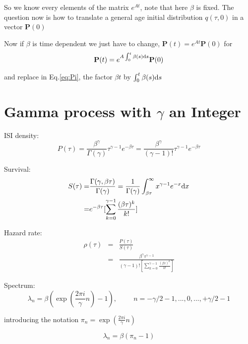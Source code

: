 \documentclass[a4paper,12pt,twoside]{article}
\def \dd  {{\rm d}}
\begin{document}
So we know every elements of the matrix $e^{At}$, note that here $\beta$ is fixed.
The question now is how to translate a general age initial distribution $q(\tau,0)$ in a vector $\textbf{P}(0)$

Now if $\beta$ is time dependent we just have to change,  $\textbf{P}(t)=e^{At}\textbf{P}(0)$ for
\begin{equation}
 \textbf{P}(t)=e^{A\int_{0}^{t}\beta(s)\dd s}\textbf{P}(0)
\end{equation}

and replace in Eq.\eqref{eq:Pi}, the factor $\beta t$ by $\int_{0}^{t}\beta(s)\dd s$

 
 

\section{Gamma process with $\gamma$ an Integer}
ISI density:
\begin{equation}
\label{eq:P}
P(\tau)=\frac{\beta^\gamma}{\Gamma(\gamma)}\tau^{\gamma-1}e^{-\beta\tau}=\frac{\beta^\gamma}{(\gamma-1)!}\tau^{\gamma-1}e^{-\beta\tau}
\end{equation}

Survival:
\begin{eqnarray}
\label{eq:S}
S(\tau)=&\frac{\Gamma(\gamma,\beta\tau)}{\Gamma(\gamma)}=\frac{1}{\Gamma(\gamma)}\int_{\beta\tau}^{\infty}x^{\gamma-1}e^{-x}\dd x\\
=&e^{-\beta \tau}[\sum_{k=0}^{\gamma-1}\frac{(\beta\tau)^k}{k!}]
\end{eqnarray}

Hazard rate:
\begin{eqnarray}
\label{eq:RHO}
\rho(\tau)&=&\frac{P(\tau)}{S(\tau)}\\
&=&\frac{\beta^\gamma\tau^{\gamma-1}}{(\gamma-1)![\sum_{k=0}^{\gamma-1}\frac{(\beta\tau)^k}{k!}]}
\end{eqnarray}

Spectrum:
\begin{equation}
\label{eq:eig}
\lambda_n=\beta\left(\exp\left(\frac{2\pi i}{\gamma}n\right)-1\right), \hspace{1cm}  n= -\gamma/2-1,...,0,...,+ \gamma/2-1  
\end{equation}

introducing the notation $\pi_n= \exp\left(\frac{2\pi i}{\gamma}n\right)$

\begin{equation}
\label{eq:eig1}
\lambda_n=\beta\left(\pi_n-1\right)
\end{equation}
\end{document}
